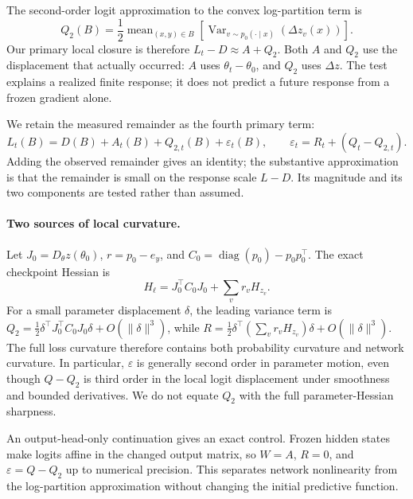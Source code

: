 The second-order logit approximation to the convex log-partition term is
\begin{equation}
  Q_2(B)=\frac12\operatorname{mean}_{(x,y)\in B}\left[\operatorname{Var}_{v\sim p_0(\cdot\mid x)}\left(\Delta z_v(x)\right)\right].
  \label{eq:q2}
\end{equation}
Our primary local closure is therefore \(L_t-D\approx A+Q_2\).  Both \(A\) and \(Q_2\) use the displacement that actually occurred: \(A\) uses \(\theta_t-\theta_0\), and \(Q_2\) uses \(\Delta z\).  The test explains a realized finite response; it does not predict a future response from a frozen gradient alone.

We retain the measured remainder as the fourth primary term:
\begin{equation}
  \boxed{L_t(B)=D(B)+A_t(B)+Q_{2,t}(B)+\varepsilon_t(B)},
  \qquad \varepsilon_t=R_t+(Q_t-Q_{2,t}).
  \label{eq:four}
\end{equation}
Adding the observed remainder gives an identity; the substantive approximation is that the remainder is small on the response scale \(L-D\).  Its magnitude and its two components are tested rather than assumed.

\paragraph{Two sources of local curvature.}
Let \(J_0=D_\theta z(\theta_0)\), \(r=p_0-e_y\), and \(C_0=\operatorname{diag}(p_0)-p_0p_0^\top\).  The exact checkpoint Hessian is
\begin{equation}
  H_\ell=J_0^\top C_0J_0+\sum_v r_v H_{z_v}.
  \label{eq:hessian}
\end{equation}
For a small parameter displacement \(\delta\), the leading variance term is
\(Q_2=\tfrac12\delta^\top J_0^\top C_0J_0\delta+O(\|\delta\|^3)\),
while \(R=\tfrac12\delta^\top(\sum_v r_vH_{z_v})\delta+O(\|\delta\|^3)\).
The full loss curvature therefore contains both probability curvature and network curvature.  In particular, \(\varepsilon\) is generally second order in parameter motion, even though \(Q-Q_2\) is third order in the local logit displacement under smoothness and bounded derivatives.  We do not equate \(Q_2\) with the full parameter-Hessian sharpness.

An output-head-only continuation gives an exact control.  Frozen hidden states make logits affine in the changed output matrix, so \(W=A\), \(R=0\), and \(\varepsilon=Q-Q_2\) up to numerical precision.  This separates network nonlinearity from the log-partition approximation without changing the initial predictive function.

